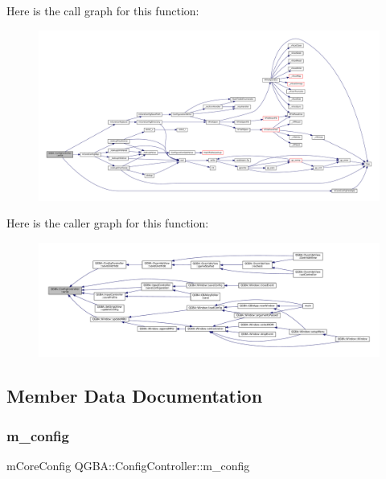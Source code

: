 Here is the call graph for this function\+:
\nopagebreak
\begin{figure}[H]
\begin{center}
\leavevmode
\includegraphics[width=350pt]{class_q_g_b_a_1_1_config_controller_a7a2b85f2324ec8ef483e6c527bce2061_cgraph}
\end{center}
\end{figure}
Here is the caller graph for this function\+:
\nopagebreak
\begin{figure}[H]
\begin{center}
\leavevmode
\includegraphics[width=350pt]{class_q_g_b_a_1_1_config_controller_a7a2b85f2324ec8ef483e6c527bce2061_icgraph}
\end{center}
\end{figure}


\subsection{Member Data Documentation}
\mbox{\label{class_q_g_b_a_1_1_config_controller_af38e003ebcdceb0401dee175d9b4bd4d}} 
\subsubsection{\texorpdfstring{m\+\_\+config}{m\_config}}
{\footnotesize\ttfamily m\+Core\+Config Q\+G\+B\+A\+::\+Config\+Controller\+::m\+\_\+config\hspace{0.3cm}{\ttfamily [private]}}

